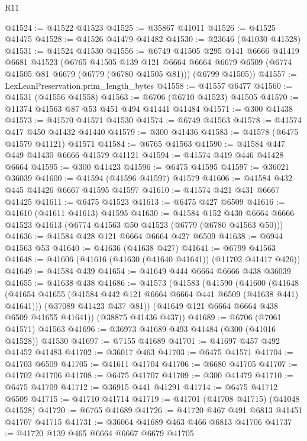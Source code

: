 \begin{lexlean}{R11}
\begin{coremodule}
@41524 := @41522 @41523
@41525 := @35867 @41011
@41526 := @41525 @41475
@41528 := @41526 @41479 @41482
@41530 := @23646 (@41030 @41528)
@41531 := @41524 @41530
@41556 := @6749
    @41505
    @295
    @141
    @6666
    @41419
    @6681
    @41523
    (@6765
      @41505
      @139
      @121
      @6664
      @6664
      @6679
      @6509
      (@6774 @41505 @81 @6679 (@6779 (@6780 @41505 @81)))
      (@6799 @41505))
@41557 := LexLeanPreservation.prim_length_bytes
@41558 := @41557 @6477
@41560 := @41531 (@41556 @41558)
@41563 := @6706 (@6710 @41523) @41505
@41570 := @11374 @41563 @87 @53 @451 @494 @41441 @41484
@41571 := @300 @41438
@41573 := @41570 @41571 @41530
@41574 := @6749 @41563
@41578 := @41574 @417 @450 @41432 @41440
@41579 := @300 @41436
@41583 := @41578 (@6475 @41579 @41121) @41571
@41584 := @6765 @41563
@41590 := @41584 @447 @449 @41430 @6666 @41579 @41121
@41594 := @41574 @419 @446 @41428 @6664
@41595 := @300 @41423
@41596 := @6475 @41595
@41597 := @36021 @36039
@41600 := @41594 (@41596 @41597) @41579
@41606 := @41584 @432 @445 @41426 @6667 @41595 @41597
@41610 := @41574 @421 @431 @6667 @41425
@41611 := @6475 @41523
@41613 := @6475 @427 @6509
@41616 := @41610 (@41611 @41613) @41595
@41630 := @41584
    @152
    @430
    @6664
    @6666
    @41523
    @41613
    (@6774 @41563 @50 @41523 (@6779 (@6780 @41563 @50)))
@41636 := @41584 @428 @121 @6664 @6664 @427 @6509
@41638 := @6944 @41563 @53
@41640 := @41636 (@41638 @427)
@41641 := @6799 @41563
@41648 := @41606 (@41616 (@41630 (@41640 @41641)) (@11702 @41417 @426))
@41649 := @41584 @439
@41654 := @41649 @444 @6664 @6666 @438 @36039
@41655 := @41638 @438
@41686 := @41573
    (@41583
      (@41590
        (@41600
          (@41648 (@41654 @41655 (@41584 @442 @121 @6664 @6664 @441 @6509 (@41638 @441) @41641)))
          (@37089 @41423 @437 @81))
        (@41649 @121 @6664 @6664 @438 @6509 @41655 @41641))
      (@38875 @41436 @437))
@41689 := @6706 (@7061 @41571) @41563
@41696 := @36973 @41689 @493 @41484 (@300 (@41016 @41528)) @41530
@41697 := @7155 @41689
@41701 := @41697 @457 @492 @41452 @41483
@41702 := @36017 @463
@41703 := @6475 @41571
@41704 := @41703 @6509
@41705 := @41611 @41704
@41706 := @6680 @41705
@41707 := @41702 @41706
@41708 := @6475 @41707
@41709 := @300 @41479
@41710 := @6475 @41709
@41712 := @36915 @441 @41291
@41714 := @6475 @41712 @6509
@41715 := @41710 @41714
@41719 := @41701 (@41708 @41715) (@41048 @41528)
@41720 := @6765 @41689
@41726 := @41720 @467 @491 @6813 @41451 @41707 @41715
@41731 := @36064 @41689 @463 @466 @6813 @41706
@41737 := @41720 @139 @465 @6664 @6667 @6679 @41705

\end{coremodule}
\end{lexlean}
